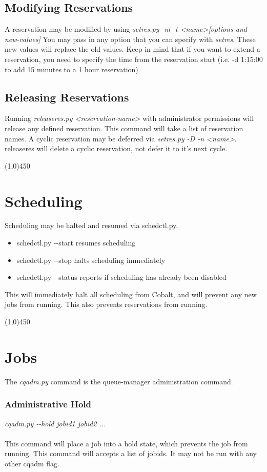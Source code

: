 \documentclass[10pt,letterpaper]{article}
\begin{document}
\subsection*{Modifying Reservations}
A reservation may be modified by using \textit{setres.py -m -t \textless name\textgreater [options-and-new-values]}
You may pass in any option that you can specify with \textit{setres}.  These new values will replace the old values.  Keep in mind that if you want to extend a reservation, you need to specify the time from the reservation start (i.e. -d 1:15:00 to add 15 minutes to a 1 hour reservation)
\subsection*{Releasing Reservations}
Running \textit{releaseres.py \textless reservation-name\textgreater} with administrator permissions will release any defined reservation.  This command will take a list of reservation names.  A cyclic reservation may be deferred via \textit{setres.py -D -n \textless name\textgreater}.  releaseres will delete a cyclic reservation, not defer it to it's next cycle.
\begin{center}
\line(1,0){450}
\end{center}
\section*{Scheduling}
Scheduling may be halted and resumed via schedctl.py.
\begin{itemize}
\item schedctl.py -\--start resumes scheduling
\item schedctl.py -\--stop halts scheduling immediately
\item schedctl.py -\--status reports if scheduling has already been disabled 
\end{itemize}
This will immediately halt all scheduling from Cobalt, and will prevent any new jobs from running.  This also prevents reservations from running.
\begin{center}
\line(1,0){450}
\end{center}
\section*{Jobs}
The \textit{cqadm.py} command is the queue-manager administration command.
\subsubsection*{Administrative Hold}
\textit{cqadm.py -\--hold jobid1 jobid2 ...}
\\
\\
This command will place a job into a hold state, which prevents the job from running.  This command will accepts a list of jobids. It may not be run with any other cqadm flag.
\end{document}
